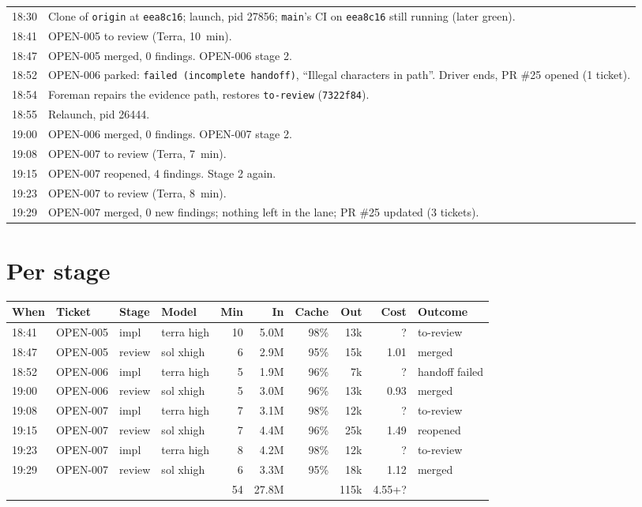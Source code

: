 \documentclass[11pt,a4paper]{article}
\begin{document}
\begin{tabularx}{\linewidth}{@{}lX@{}}
\toprule
18:30 & Clone of \texttt{origin} at \texttt{eea8c16}; launch, pid 27856; \texttt{main}'s CI on \texttt{eea8c16} still running (later green). \\
18:41 & OPEN-005 to review (Terra, 10~min). \\
18:47 & OPEN-005 merged, 0 findings. OPEN-006 stage 2. \\
18:52 & OPEN-006 parked: \texttt{failed (incomplete handoff)}, ``Illegal characters in path''. Driver ends, PR \#25 opened (1 ticket). \\
18:54 & Foreman repairs the evidence path, restores \texttt{to-review} (\texttt{7322f84}). \\
18:55 & Relaunch, pid 26444. \\
19:00 & OPEN-006 merged, 0 findings. OPEN-007 stage 2. \\
19:08 & OPEN-007 to review (Terra, 7~min). \\
19:15 & OPEN-007 reopened, 4 findings. Stage 2 again. \\
19:23 & OPEN-007 to review (Terra, 8~min). \\
19:29 & OPEN-007 merged, 0 new findings; nothing left in the lane; PR \#25 updated (3 tickets). \\
\bottomrule
\end{tabularx}

\section*{Per stage}

{\small
\begin{tabularx}{\linewidth}{@{}llllrrrrrX@{}}
\toprule
When & Ticket & Stage & Model & Min & In & Cache & Out & Cost & Outcome \\
\midrule
18:41 & OPEN-005 & impl & terra high & 10 & 5.0M & 98\% & 13k & ? & to-review \\
18:47 & OPEN-005 & review & sol xhigh & 6 & 2.9M & 95\% & 15k & 1.01 & merged \\
18:52 & OPEN-006 & impl & terra high & 5 & 1.9M & 96\% & 7k & ? & handoff failed \\
19:00 & OPEN-006 & review & sol xhigh & 5 & 3.0M & 96\% & 13k & 0.93 & merged \\
19:08 & OPEN-007 & impl & terra high & 7 & 3.1M & 98\% & 12k & ? & to-review \\
19:15 & OPEN-007 & review & sol xhigh & 7 & 4.4M & 96\% & 25k & 1.49 & reopened \\
19:23 & OPEN-007 & impl & terra high & 8 & 4.2M & 98\% & 12k & ? & to-review \\
19:29 & OPEN-007 & review & sol xhigh & 6 & 3.3M & 95\% & 18k & 1.12 & merged \\
\midrule
 & & & & 54 & 27.8M & & 115k & 4.55+? & \\
\bottomrule
\end{tabularx}
}
\end{document}
